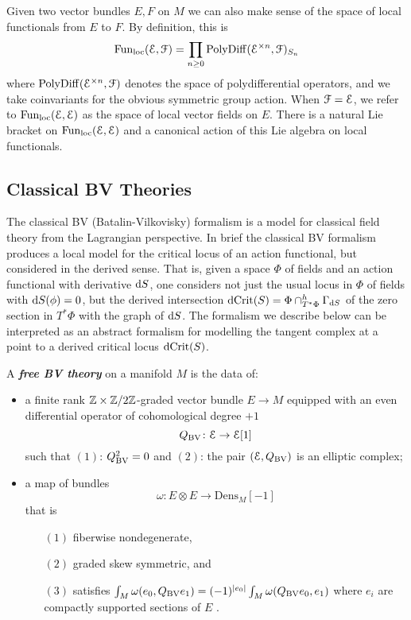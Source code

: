 \documentclass[10pt, oneside]{article}
\newcommand{\Dens}{\mathrm{Dens}}
\newcommand{\defterm}[1]{\textbf{\emph{#1}}}
\begin{document}
Given two vector bundles $E, F$ on $M$ we can also make sense of the space of local functionals from $E$ to $F$.
By definition, this is 
\[
{\rm Fun}_{\rm loc}(\mathcal E, \mathcal F) = \prod_{n \geq 0} {\rm PolyDiff}(\mathcal E^{\times n}, \mathcal F)_{S_n}
\]
where ${\rm PolyDiff}(\mathcal E^{\times n}, \mathcal F)$ denotes the space of polydifferential operators, and we take coinvariants for the obvious symmetric group action.
When $\mathcal F = \mathcal E$, we refer to ${\rm Fun}_{\rm loc}(\mathcal E, \mathcal E)$ as the space of local vector fields on $E$. 
There is a natural Lie bracket on ${\rm Fun}_{\rm loc}(\mathcal E, \mathcal E)$ and a canonical action of this Lie algebra on local functionals. 

\subsection{Classical BV Theories}

The classical BV (Batalin-Vilkovisky) formalism \cite{BatalinVilkovisky} is a model for classical field theory from the Lagrangian perspective.  In brief the classical BV formalism produces a local model for the critical locus of an action functional, but considered in the derived sense.  That is, given a space $\Phi$ of fields and an action functional with derivative ${\rm d} S$, one considers not just the usual locus in $\Phi$ of fields with ${\rm d} S(\phi) = 0$, but the derived intersection $\mathrm{dCrit}(S) = \Phi \cap^h_{T^*\Phi} \Gamma_{{\rm d} S}$ of the zero section in $T^*\Phi$ with the graph of ${\rm d} S$.  The formalism we describe below can be interpreted as an abstract formalism for modelling the tangent complex at a point to a derived critical locus $\mathrm{dCrit}(S)$.

\begin{definition}
A \defterm{free BV theory} on a manifold $M$ is the data of:
\begin{itemize}
\item a finite rank $\mathbb Z\times\mathbb Z/2\mathbb Z$-graded vector bundle $E \to M$ equipped with an even differential operator of cohomological degree $+1$
\[
Q_{\mathrm{BV}} \colon \mathcal E \to \mathcal E [1] 
\]
such that $(1)$: $Q_{\mathrm{BV}}^2 = 0$ and $(2)$: the pair $(\mathcal E , Q_{\mathrm{BV}})$ is an elliptic complex;
\item a map of bundles
\[
\omega\colon E \otimes E \to \Dens_M [-1]
\]
that is
\begin{enumerate}
\item[$(1)$] fiberwise nondegenerate,
\item[$(2)$] graded skew symmetric, and
\item[$(3)$] satisfies $\int_M \omega(e_0, Q_{\mathrm{BV}} e_1) = (-1)^{|e_0|} \int_M \omega(Q_{\mathrm{BV}} e_0, e_1)$ where $e_i$ are compactly supported sections of $E$ .
\end{enumerate}
\end{itemize}
\end{definition}
\end{document}
